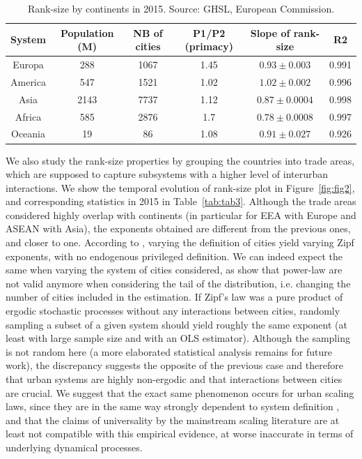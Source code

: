 \documentclass[11pt]{article}
\begin{document}
\begin{table}
\caption{Rank-size by continents in 2015. Source: GHSL, European Commission.\label{tab:tab2}}
\centering
\begin{tabular}{cccccc}
\toprule
System & Population (M) & NB of cities & P1/P2 (primacy) & Slope of rank-size & R2 \\
\midrule
Europa & 288 & 1067 & 1.45 & $0.93 \pm 0.003$ & 0.991 \\
America & 547 & 1521 & 1.02 & $1.02 \pm 0.002$ & 0.996 \\
Asia & 2143 & 7737 & 1.12 & $0.87 \pm 0.0004$ & 0.998 \\
Africa & 585 & 2876 & 1.7 & $0.78 \pm 0.0008$ & 0.997 \\
Oceania & 19 & 86 & 1.08 & $0.91 \pm 0.027$ & 0.926\\
\bottomrule
\end{tabular}
\end{table}

We also study the rank-size properties by grouping the countries into trade areas, which are supposed to capture subsystems with a higher level of interurban interactions. We show the temporal evolution of rank-size plot in Figure~\ref{fig:fig2}, and corresponding statistics in 2015 in Table~\ref{tab:tab3}. Although the trade areas considered highly overlap with continents (in particular for EEA with Europe and ASEAN with Asia), the exponents obtained are different from the previous ones, and closer to one. According to \cite{arcaute2020scaling}, varying the definition of cities yield varying Zipf exponents, with no endogenous privileged definition. We can indeed expect the same when varying the system of cities considered, as \cite{corral2020truncated} show that power-law are not valid anymore when considering the tail of the distribution, i.e. changing the number of cities included in the estimation. If Zipf’s law was a pure product of ergodic stochastic processes without any interactions between cities, randomly sampling a subset of a given system should yield roughly the same exponent (at least with large sample size and with an OLS estimator). Although the sampling is not random here (a more elaborated statistical analysis remains for future work), the discrepancy suggests the opposite of the previous case and therefore that urban systems are highly non-ergodic and that interactions between cities are crucial. We suggest that the exact same phenomenon occurs for urban scaling laws, since they are in the same way strongly dependent to system definition \cite{arcaute2015constructing,cottineau2017diverse}, and that the claims of universality by the mainstream scaling literature are at least not compatible with this empirical evidence, at worse inaccurate in terms of underlying dynamical processes.
\end{document}
